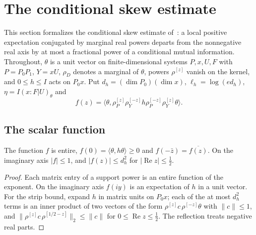 
\section{The conditional skew estimate}
\label{ch:conditional_skew}

This section formalizes the conditional skew estimate
of~\cite[Lemma~5.3]{OpenAI2026AreaLaw}: a local positive expectation
conjugated by marginal real powers departs from the nonnegative real axis by
at most a fractional power of a conditional mutual information. Throughout,
$\theta$ is a unit vector on finite-dimensional systems $P,x,U,F$ with
$P=P_0P_1$, $Y=xU$, $\rho_D$ denotes a marginal of $\theta$, powers
$\rho^{[z]}$ vanish on the kernel, and $0\le h\le I$ acts on $P_0x$. Put
$d_h=(\dim P_0)(\dim x)$, $\ell_h=\log(ed_h)$, $\eta=I(x:F|U)_\theta$ and
\[
  f(z)=\langle\theta,\rho_P^{[z]}\rho_Y^{[-z]}h\rho_P^{[-z]}\rho_Y^{[z]}\theta\rangle .
\]

\subsection{The scalar function}

\begin{lemma}
    \label{lem:skew_function}
    \leanok
    The function $f$ is entire, $f(0)=\langle\theta,h\theta\rangle\ge0$ and
    $f(-\bar z)=\overline{f(z)}$. On the imaginary axis $|f|\le1$, and
    $|f(z)|\le d_h^2$ for $|\operatorname{Re}z|\le\frac12$.
\end{lemma}

\begin{proof}\leanok
    Each matrix entry of a support power is an entire function of the exponent.
    On the imaginary axis $f(iy)$ is an expectation of $h$ in a unit vector.
    For the strip bound, expand $h$ in matrix units on $P_0x$; each of the at
    most $d_h^2$ terms is an inner product of two vectors of the form
    $\rho^{[z]}c\,\rho^{[-z]}\theta$ with $\lVert c\rVert\le1$, and
    $\lVert\rho^{[z]}c\,\rho^{[1/2-z]}\rVert_2\le\lVert c\rVert$ for
    $0\le\operatorname{Re}z\le\frac12$. The reflection treats negative real
    parts.
\end{proof}

